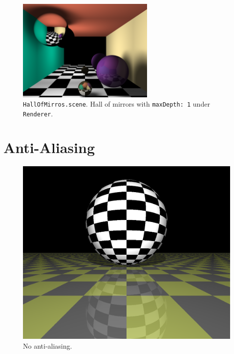 \documentclass{article}
\begin{document}
\begin{figure}[H]
    \centering
    \includegraphics[width=0.6\textwidth]{./examples/HallOfMirrorsDepth3.png}
    \caption{\texttt{HallOfMirros.scene}. Hall of mirrors with \texttt{maxDepth: 1} under \texttt{Renderer}.}
\end{figure}

\section{Anti-Aliasing}

\begin{figure}[H]
    \includegraphics[width=\textwidth]{./examples/AntiAliasingComparison/Scene_noAntiAliasing.png}
    \caption{No anti-aliasing.}
\end{figure}
\end{document}
